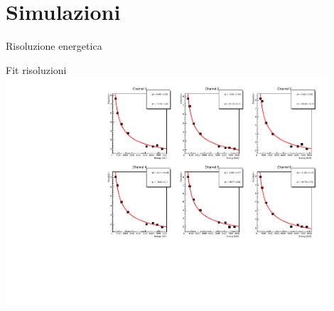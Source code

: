 \documentclass [xcolor=svgnames] {beamer}
\begin{document}





\section{Simulazioni}
\begin{frame}{Risoluzione energetica}%
%		
\end{frame}
\begin{frame}{Fit risoluzioni}
	\centering
	\includegraphics[width=0.9\textwidth]{img/ResolutionGraphs.pdf}
\end{frame}
\end{document}
